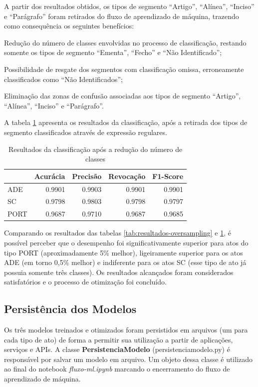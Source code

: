 A partir dos resultados obtidos, os tipos de segmento ``Artigo'', ``Alínea'', ``Inciso'' e ``Parágrafo'' foram retirados do fluxo de aprendizado de máquina, trazendo como consequência os seguintes benefícios:
\begin{alineas}
	\item Redução do número de classes envolvidas no processo de classificação, restando somente os tipos de segmento ``Ementa'', ``Fecho'' e ``Não Identificado'';
	\item Possibilidade de resgate dos segmentos com classificação omissa, erroneamente classificados como ``Não Identificados'';
	\item Eliminação das zonas de confusão associadas aos tipos de segmento ``Artigo'', ``Alínea'', ``Inciso'' e ``Parágrafo''.
\end{alineas}  

A tabela \ref{tab:resultados-apos-classificacao-regex} apresenta os resultados da classificação, após a retirada dos tipos de segmento classificados através de expressão regulares. 

\begin{table}[h]
\caption{Resultados da classificação após a redução do número de  classes}
\label{tab:resultados-apos-classificacao-regex}
	\begin{center}
	\begin{tabular}{lrrrr}
		\toprule
		{} &  Acurácia &  Precisão &  Revocação &      F1-Score \\
		\midrule
		ADE     &    0.9901 &    0.9903 &     0.9901 &  0.9901 \\
		SC      &    0.9798 &    0.9803 &     0.9798 &  0.9797 \\					PORT 	&    0.9687 &    0.9710 &     0.9687 &  0.9685 \\
		\bottomrule
	\end{tabular}
	\end{center}		
\end{table}


Comparando os resultados das tabelas \ref{tab:resultados-oversampling} e \ref{tab:resultados-apos-classificacao-regex}, é possível perceber que  o desempenho foi significativamente superior para atos do tipo PORT (aproximadamente 5\% melhor), ligeiramente superior para os atos ADE (em torno 0,5\% melhor) e indiferente para os atos SC (esse tipo de ato já possuia somente três classes). Os resultados alcançados foram considerados satisfatórios e o processo de otimização foi concluído.

\subsection{Persistência dos Modelos}

Os três modelos treinados e otimizados foram persistidos em arquivos (um para cada tipo de ato) de forma a permitir sua utilização a partir de aplicações, serviços e APIs. A classe \textbf{PersistenciaModelo} (persistencia\textunderscore modelo.py) é responsável por salvar um modelo em arquivo. Um objeto dessa classe é utilizado ao final do notebook \textit{fluxo-ml.ipynb} marcando o encerramento do fluxo de aprendizado de máquina. 

